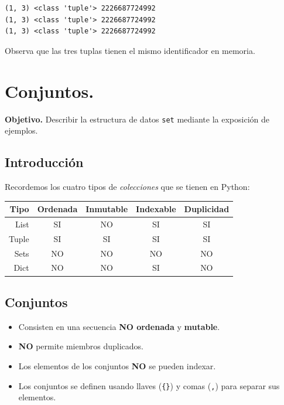 \documentclass[
  spanish,
  letterpaper,
]{scrbook}
\providecommand{\tightlist}{%
  \setlength{\itemsep}{0pt}\setlength{\parskip}{0pt}}
\theoremstyle{definition}
\theoremstyle{remark}
\begin{document}
\begin{verbatim}
(1, 3) <class 'tuple'> 2226687724992
(1, 3) <class 'tuple'> 2226687724992
(1, 3) <class 'tuple'> 2226687724992
\end{verbatim}

Observa que las tres tuplas tienen el mismo identificador en memoria.

\chapter{Conjuntos.}\label{sec-k-tuplas}

\textbf{Objetivo.} Describir la estructura de datos \texttt{set}
mediante la exposición de ejemplos.

\section{Introducción}\label{introducciuxf3n-2}

Recordemos los cuatro tipos de \emph{colecciones} que se tienen en
Python:

\begin{longtable}[]{@{}rcccc@{}}
\toprule\noalign{}
Tipo & Ordenada & Inmutable & Indexable & Duplicidad \\
\midrule\noalign{}
\endhead
\bottomrule\noalign{}
\endlastfoot
List & SI & NO & SI & SI \\
Tuple & SI & SI & SI & SI \\
Sets & NO & NO & NO & NO \\
Dict & NO & NO & SI & NO \\
\end{longtable}

\section{Conjuntos}\label{conjuntos}

\begin{itemize}
\tightlist
\item
  Consisten en una secuencia \textbf{NO ordenada} y \textbf{mutable}.
\item
  \textbf{NO} permite miembros duplicados.
\item
  Los elementos de los conjuntos \textbf{NO} se pueden indexar.
\item
  Los conjuntos se definen usando llaves (\texttt{\{\}}) y comas
  (\texttt{,}) para separar sus elementos.
\end{itemize}
\end{document}

